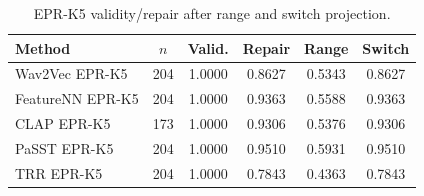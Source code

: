 \documentclass[journal,10pt]{IEEEtran}
\begin{document}
\begin{table}[htbp]
\centering
\caption{EPR-K5 validity/repair after range and switch projection.}
\label{tab:supp_epr_validity}
\footnotesize
\setlength{\tabcolsep}{3pt}
\begin{tabular}{lccccc}
\toprule
\textbf{Method} & \textbf{$n$} & \textbf{Valid.} & \textbf{Repair} & \textbf{Range} & \textbf{Switch} \\
\midrule
Wav2Vec EPR-K5 & 204 & 1.0000 & 0.8627 & 0.5343 & 0.8627 \\
FeatureNN EPR-K5 & 204 & 1.0000 & 0.9363 & 0.5588 & 0.9363 \\
CLAP EPR-K5 & 173 & 1.0000 & 0.9306 & 0.5376 & 0.9306 \\
PaSST EPR-K5 & 204 & 1.0000 & 0.9510 & 0.5931 & 0.9510 \\
TRR EPR-K5 & 204 & 1.0000 & 0.7843 & 0.4363 & 0.7843 \\
\bottomrule
\end{tabular}
\end{table}
\end{document}
